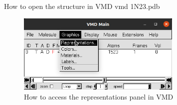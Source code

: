     \begin{bashcmd}[label=cmd:vmd]{How to open the structure in VMD}
    vmd 1N23.pdb
    \end{bashcmd}

    \begin{figure}[H]
        \centering
        \includegraphics[width=0.7\textwidth]{Graphics/ScreenShots/Representations.png}
        \caption{How to access the representations panel in VMD}
        \label{fig:Repres}
    \end{figure}

